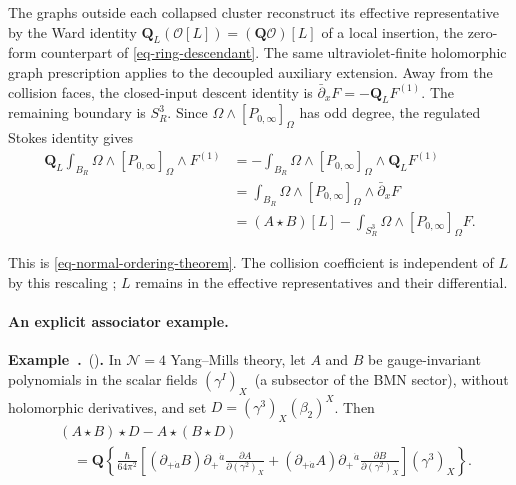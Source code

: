 \documentclass[11pt]{article}
\numberwithin{equation}{section}
\numberwithin{figure}{section}
\numberwithin{table}{section}
\newcounter{rthmc}[section]
\renewcommand{\therthmc}{\thesection.\arabic{rthmc}}
\newcommand{\rthm}[3]{\par\addvspace{\medskipamount}\noindent\refstepcounter{rthmc}\label{#2}\textbf{#1~\therthmc}\if\relax\detokenize{#3}\relax\else\ (#3)\fi\textbf{.}}
\begin{document}
The graphs outside each collapsed cluster reconstruct its effective representative by the Ward identity $\mathbf Q_L(\mathcal O[L])=(\mathbf Q\mathcal O)[L]$ of a local insertion, the zero-form counterpart of \eqref{eq-ring-descendant}. The same ultraviolet-finite holomorphic graph prescription applies to the decoupled auxiliary extension. Away from the collision faces, the closed-input descent identity is $\bar\partial_xF=-\mathbf Q_LF^{(1)}$. The remaining boundary is $S_R^3$. Since $\Omega\wedge[P_{0,\infty}]_\Omega$ has odd degree, the regulated Stokes identity gives
\begin{equation}\label{eq-normal-ordering-stokes}
\begin{aligned}
\mathbf Q_L\int_{B_R}\Omega\wedge[P_{0,\infty}]_\Omega\wedge F^{(1)}
&=-\int_{B_R}\Omega\wedge[P_{0,\infty}]_\Omega\wedge\mathbf Q_LF^{(1)}\\
&=\int_{B_R}\Omega\wedge[P_{0,\infty}]_\Omega\wedge\bar\partial_xF\\
&=(A\star B)[L]-\int_{S_R^3}\Omega\wedge[P_{0,\infty}]_\Omega F.
\end{aligned}
\end{equation}

This is \eqref{eq-normal-ordering-theorem}. The collision coefficient is independent of $L$ by this rescaling \cite[Theorem 6]{Wang}; $L$ remains in the effective representatives and their differential.\hfill\qedsymbol

\paragraph{An explicit associator example.}\label{an-explicit-associator}

\rthm{Example}{b-00610}{} In $\mathcal N=4$ Yang--Mills theory, let $A$ and $B$ be gauge-invariant polynomials in the scalar fields $(\gamma^I)_X$~(a subsector of the BMN sector), without holomorphic derivatives, and set $D=(\gamma^3)_X(\beta_2)^X$. Then
\begin{equation}\label{eq-ring-scalar-associator}
\begin{aligned}
&(A\star B)\star D-A\star(B\star D)\\
&\quad=\mathbf Q\left\{
\frac{\hbar}{64\pi^2}
\left[
(\partial_{+\dot a}B)\partial_+{}^{\dot a}
\frac{\partial A}{\partial(\gamma^2)_X}
+(\partial_{+\dot a}A)\partial_+{}^{\dot a}
\frac{\partial B}{\partial(\gamma^2)_X}
\right](\gamma^3)_X\right\}.
\end{aligned}
\end{equation}
\end{document}
